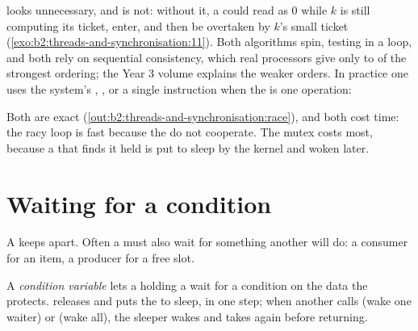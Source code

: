  looks unnecessary, and is not: without it, a  could read  as 0 while $k$ is
still computing its ticket, enter, and then be overtaken by $k$'s small ticket (\cref{exo:b2:threads-and-synchronisation:11}).
Both algorithms spin, testing in a loop, and both rely on sequential consistency, which real processors give only to
 of the strongest ordering; the Year 3 volume explains the weaker orders. In practice one uses the
system's , , or a single  instruction when the  is one operation:


Both are exact (\cref{out:b2:threads-and-synchronisation:race}), and both cost time: the racy loop is fast because the
 do not cooperate. The mutex costs most, because a  that finds it held is put to sleep by the kernel and
woken later.

\section{Waiting for a condition}\label{sec:b2:threads-and-synchronisation:conditions}

A  keeps  apart. Often a  must also wait for something another  will do: a consumer for an
item, a producer for a free slot.

\begin{definition}\label{def:b2:threads-and-synchronisation:condvar}
A \emph{condition variable} lets a  holding a  wait for a condition on the data
the  protects.  releases  and puts the  to sleep, in one step; when
another  calls  (wake one waiter) or  (wake all),
the sleeper wakes and takes  again before returning.
\end{definition}

